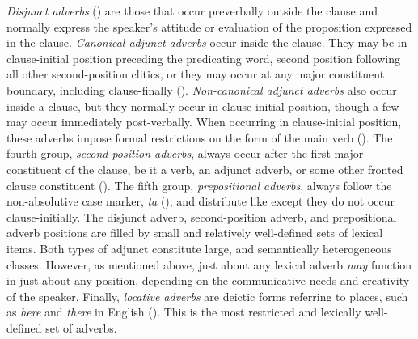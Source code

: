\textit{Disjunct adverbs} () are those that occur preverbally outside the clause and normally express the speaker’s attitude or evaluation of the proposition expressed in the clause. \textit{Canonical adjunct adverbs} occur inside the clause. They may be in clause-initial position preceding the predicating word, second position following all other second-position clitics, or they may occur at any major constituent boundary, including clause-finally (). \textit{Non-canonical adjunct adverbs} also occur inside a clause, but they normally occur in clause-initial position, though a few may occur immediately post-verbally. When occurring in clause-initial position, these adverbs impose formal restrictions on the form of the main verb (). The fourth group, \textit{second-position adverbs}, always occur after the first major constituent of the clause, be it a verb, an adjunct adverb, or some other fronted clause constituent (). The fifth group, \textit{prepositional adverbs}, always follow the non-absolutive case marker, \textit{ta} (), and distribute like  except they do not occur clause-initially. The disjunct adverb, second-position adverb, and prepositional adverb positions are filled by small and relatively well-defined sets of lexical items. Both types of adjunct  constitute large, and semantically heterogeneous classes. However, as mentioned above, just about any lexical adverb \textit{may} function in just about any position, depending on the communicative needs and creativity of the speaker. Finally, \textit{locative adverbs} are deictic forms referring to places, such as \textit{here} and \textit{there} in English (). This is the most restricted and lexically well-defined set of adverbs.

